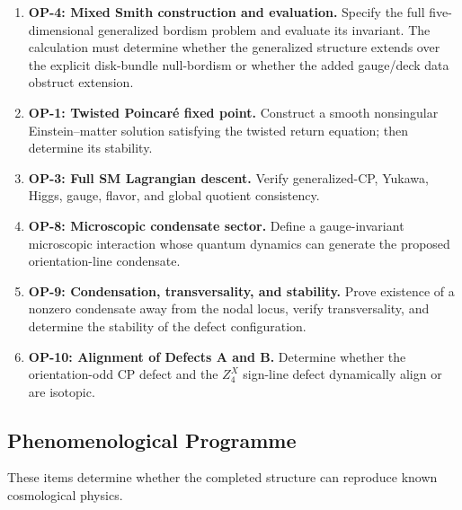 \documentclass[11pt]{article}
\theoremstyle{canonmath}
\theoremstyle{canonpostulate}
\theoremstyle{canonclaim}
\def\mathbb#1{#1}%
\begin{document}
\begin{enumerate}
\item \textbf{OP-4: Mixed Smith construction and evaluation.} Specify the full five-dimensional generalized bordism problem and evaluate its invariant. The calculation must determine whether the generalized structure extends over the explicit disk-bundle null-bordism or whether the added gauge/deck data obstruct extension.
\item \textbf{OP-1: Twisted Poincar\'e fixed point.} Construct a smooth nonsingular Einstein--matter solution satisfying the twisted return equation; then determine its stability.
\item \textbf{OP-3: Full SM Lagrangian descent.} Verify generalized-CP, Yukawa, Higgs, gauge, flavor, and global quotient consistency.
\item \textbf{OP-8: Microscopic condensate sector.} Define a gauge-invariant microscopic interaction whose quantum dynamics can generate the proposed orientation-line condensate.
\item \textbf{OP-9: Condensation, transversality, and stability.} Prove existence of a nonzero condensate away from the nodal locus, verify transversality, and determine the stability of the defect configuration.
\item \textbf{OP-10: Alignment of Defects A and B.} Determine whether the orientation-odd CP defect and the $\mathbb Z_4^X$ sign-line defect dynamically align or are isotopic.
\end{enumerate}

\subsection*{Phenomenological Programme}
These items determine whether the completed structure can reproduce known cosmological physics.
\end{document}
